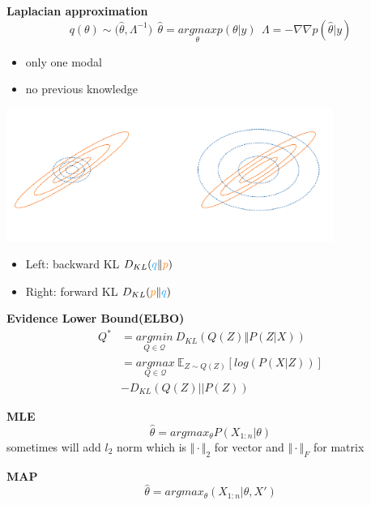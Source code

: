 \documentclass[landscape,a0paper,fontscale=0.285]{baposter} %
\newcommand{\compresslist}{ %
\setlength{\itemsep}{1pt}
\setlength{\parskip}{0pt}
\setlength{\parsep}{0pt}
}
\begin{document}
\begin{poster}
{\colorbox[HTML]{CCFFFF}{}
\textbf{Laplacian approximation}
\vspace{-0.3cm}
$$
q(\theta)\sim \mathcal (\hat\theta, \Lambda^{-1})~~
\hat\theta = \underset{\theta}{argmax}p(\theta|y)~~
\Lambda = -\nabla\nabla p(\hat\theta|y)
$$
\vspace{-0.3cm}
\begin{itemize}\compresslist
    \item only one modal 
    \item no previous knowledge
\end{itemize}
\vspace{-0.5cm}
\begin{center}
\includegraphics[width=0.8\textwidth, trim={0cm 3cm 0 2cm},clip]{figures/F5wAvc7PQ2CK3qB.png}
\end{center}
\vspace{-1cm}
\begin{itemize}\compresslist
    \item Left: backward KL $D_{KL}(\textcolor{lightblue}{q}\Vert \textcolor{orange}{p})$ 
    \item Right: forward KL $D_{KL}(\textcolor{orange}{p}\Vert \textcolor{lightblue}{q})$
\end{itemize}

\textbf{Evidence Lower Bound(ELBO)}
\vspace{-0.3cm}
$$
\begin{aligned}
Q^* &= \underset{Q\in\mathcal Q}{argmin}~D_{KL}(Q(Z)\Vert P(Z|X)) 
\\
&= \underset{Q\in\mathcal Q}{argmax}~\mathbb E_{Z\sim Q(Z)}[log(P(X|Z))] 
\\
&- D_{KL}(Q(Z)||P(Z))
\end{aligned}
$$

\textbf{MLE}
\vspace{-0.3cm}
$$
\hat \theta = argmax_{\theta}P(X_{1:n}|\theta)
$$
sometimes will add $l_2$ norm which is $\Vert \cdot\Vert_2$ for vector and $\Vert \cdot \Vert_F$ for matrix

\textbf{MAP}
\vspace{-0.3cm}
$$
\hat \theta = argmax_\theta(X_{1:n}|\theta,X')
$$

}
\end{poster}
\end{document}
